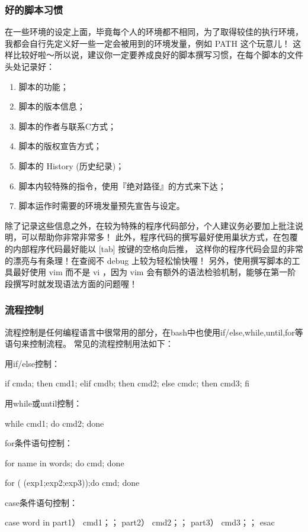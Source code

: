 \subsubsection{好的脚本习惯}
在一些环境的设定上面，毕竟每个人的环境都不相同，为了取得较佳的执行环境， 我都会自行先定义好一些一定会被用到的环境发量，例如 PATH 这个玩意儿！ 这样比较好啦～所以说，建议你一定要养成良好的脚本撰写习惯，在每个脚本的文件头处记录好：
\begin{enumerate}
	\item 脚本的功能；
	\item 脚本的版本信息；
	\item 脚本的作者与联系C方式；
	\item 脚本的版权宣告方式；
	\item 脚本的 History (历史纪录)；
	\item 脚本内较特殊的指令，使用『绝对路径』的方式来下达；
	\item 脚本运作时需要的环境发量预先宣告与设定。
\end{enumerate}

除了记录这些信息之外，在较为特殊的程序代码部分，个人建议务必要加上批注说明，可以帮助你非常非常多！ 此外，程序代码的撰写最好使用巢状方式，在包覆的内部程序代码最好能以 [tab] 按键的空格向后推， 这样你的程序代码会显的非常的漂亮与有条理！在查阅不 debug 上较为轻松愉快喔！ 另外，使用撰写脚本的工具最好使用 vim 而不是 vi ，因为 vim 会有额外的语法检验机制，能够在第一阶段撰写时就发现语法方面的问题喔！

\subsubsection{流程控制}

流程控制是任何编程语言中很常用的部分，在bash中也使用if/else,while,until,for等语句来控制流程。
常见的流程控制用法如下：

用if/else控制：
\begin{Code}
if cmda; then
cmd1;
elif cmdb; then
cmd2;
else cmdc; then
cmd3; 
fi
\end{Code}
用while或until控制：
\begin{Code}
while cmd1; do
cmd2;
done
\end{Code}
for条件语句控制：
\begin{Code}
for name in words; do
cmd;
done

for ( (exp1;exp2;exp3));do
cmd;
done
\end{Code}
case条件语句控制：
\begin{Code}
case word in
part1） cmd1；；
part2） cmd2；；
part3） cmd3；；
esac

\end{Code}

